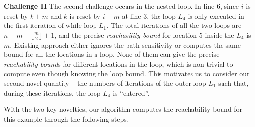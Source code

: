 \textbf{Challenge II} The second challenge occurs in the nested loop.
In line 6, since $i$ is reset by $k + m$ and $k$ is reset by $i - m$ at line 3, the
loop $L_4$ is only executed in the first iteration of while loop $L_1$.
The total iterations of all the two loops are
$n - m + \lfloor\frac{m}{2}\rfloor + 1$,
and the precise \emph{reachability-bound} for location $5$ inside the $L_4$ is $m$.
Existing approach either ignores the path sensitivity or computes the same bound for all the locations in a loop.
None of them can give the precise \emph{reachability-bound}s for different locations in the loop,
which is non-trivial to compute even though knowing the loop bound.
This motivates us to consider our second novel quantity --
the numbers of iterations of the outer loop $L_1$ such that,
during these iterations, the loop $L_4$ is ``entered''. 

With the two key novelties, our algorithm computes the reachability-bound for this example through the following steps.
